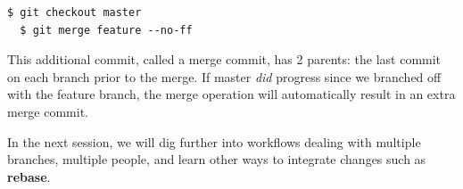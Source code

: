 \documentclass[a4paper]{../../common/tufte-latex/tufte-handout}
\begin{document}
\begin{lstlisting}[style=BashInputStyle]
  $ git checkout master
  $ git merge feature --no-ff
\end{lstlisting}

This additional commit, called a merge commit, has 2 parents: the last commit on each branch prior to the merge.
If master \textit{did} progress since we branched off with the feature branch, the merge operation will automatically result in an extra merge commit.

In the next session, we will dig further into workflows dealing with multiple branches, multiple people, and learn other ways to integrate changes such as \textbf{rebase}.



\end{document}
